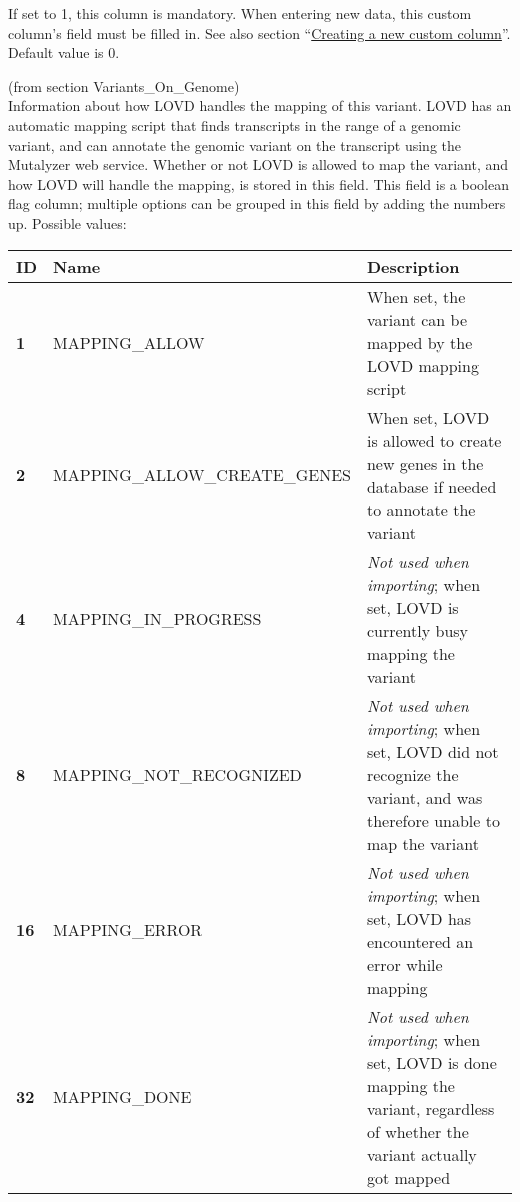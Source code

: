 \documentclass[a4paper,oneside,openany,12pt]{memoir}
\begin{document}
\begin{description}
  If set to 1, this column is mandatory.
  When entering new data, this custom column's field must be filled in.
  See also section ``\hyperlink{sec:custom_column_create}{Creating a new custom column}''.
  Default value is 0.
  \item[mapping\_flags] (from section Variants\_On\_Genome)\hfill \\
  Information about how LOVD handles the mapping of this variant.
  LOVD has an automatic mapping script that finds transcripts in the range of a genomic variant, and can annotate the
    genomic variant on the transcript using the Mutalyzer web service.
  Whether or not LOVD is allowed to map the variant, and how LOVD will handle the mapping, is stored in this field.
  This field is a boolean flag column; multiple options can be grouped in this field by adding the numbers up.
  Possible values:\\
  \begin{tabular}{>{\bfseries}p{0.6cm} p{7.7cm} p{6.3cm}}
    ID & \textbf{Name} & \textbf{Description}\\ \hline \hline
    1 & MAPPING\_ALLOW & When set, the variant can be map\-ped by the LOVD mapping script\\ \hline
    2 & MAPPING\_ALLOW\_CREATE\_GENES & When set, LOVD is allowed to create new genes in the database if needed to
      annotate the variant\\ \hline
    4 & MAPPING\_IN\_PROGRESS & \emph{Not used when importing}; when set, LOVD is currently busy mapping the
      variant\\ \hline
    8 & MAPPING\_NOT\_RECOGNIZED & \emph{Not used when importing}; when set, LOVD did not recognize the variant, and
      was therefore unable to map the variant\\ \hline
    16 & MAPPING\_ERROR & \emph{Not used when importing}; when set, LOVD has encountered an error while mapping\\ \hline
    32 & MAPPING\_DONE & \emph{Not used when importing}; when set, LOVD is done mapping the variant, regardless of
      whether the variant actually got mapped\\ \hline
  \end{tabular}


\end{description}
\end{document}
